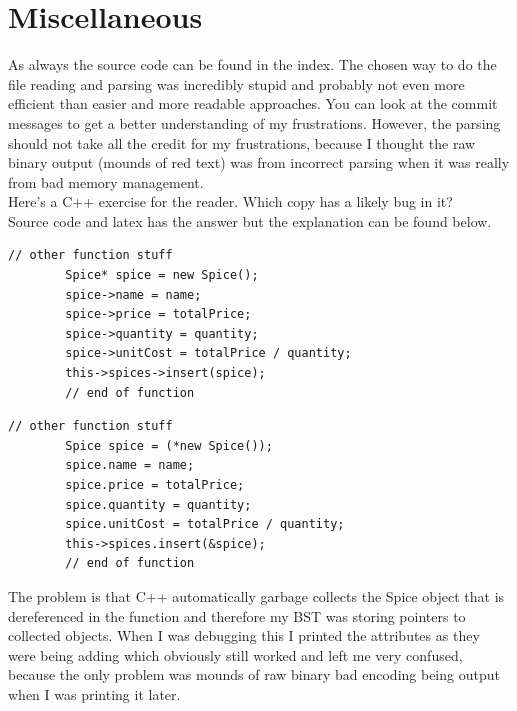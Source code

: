 \documentclass[letterpaper, 10pt]{article}
\begin{document}
\section{Miscellaneous}
As always the source code can be found in the index. The chosen way to do the file
reading and parsing was incredibly stupid and probably not even more efficient than
easier and more readable approaches. You can look at the commit messages to 
get a better understanding of my frustrations. However, the parsing should not take
all the credit for my frustrations, because I thought the raw binary output (mounds of red text)
was from incorrect parsing when it was really from bad memory management.\\
\newline
Here's a C++ exercise for the reader. Which copy has a likely bug in it? \\
Source code and latex has the answer but the explanation can be found below.
\begin{lstlisting}[]
        // other function stuff
        Spice* spice = new Spice();
        spice->name = name;
        spice->price = totalPrice;
        spice->quantity = quantity;
        spice->unitCost = totalPrice / quantity;
        this->spices->insert(spice);
        // end of function
\end{lstlisting}

\begin{lstlisting}[]
        // other function stuff
        Spice spice = (*new Spice()); 
        spice.name = name;
        spice.price = totalPrice;
        spice.quantity = quantity;
        spice.unitCost = totalPrice / quantity;
        this->spices.insert(&spice);
        // end of function
\end{lstlisting}
The problem is that C++ automatically garbage collects the Spice object that is
dereferenced in the function and therefore my BST was storing pointers to collected objects. 
When I was debugging this I printed the attributes as they were being adding which obviously still worked
and left me very confused, because the only problem was mounds of raw binary bad encoding being output
when I was printing it later.
\end{document}
